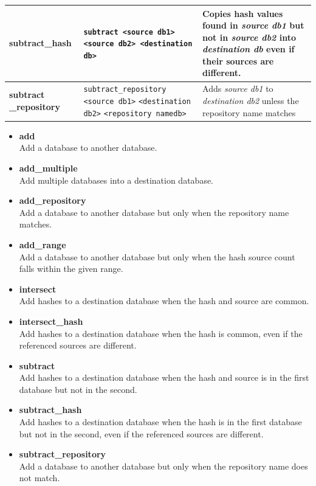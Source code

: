 \documentclass[11pt,fleqn]{article} %
\begin{document}
\begin{table}[!ht]
\begin{tabular}{|p{3.5 cm}|p{6 cm}|p{4 cm}|}
\hline
\textbf{subtract\_hash} & \verb+subtract <source db1>+ \verb+<source db2> <destination db>+&   Copies hash values found in \textit{source db1} but not in \textit{source db2} into \textit{destination db} even if their sources are different.\\
\hline
\textbf{subtract \_repository} & \verb+subtract_repository+ \verb+<source db1>+ \verb+<destination db2>+ \verb+<repository namedb>+ & Adds \textit{source db1} to \textit{destination db2} unless the repository name matches\\
\hline
\end{tabular}
\end{table}

\begin{itemize}
\item \textbf{add}\\
Add a database to another database.
\item \textbf{add\_multiple}\\
Add multiple databases into a destination database.
\item \textbf{add\_repository}\\
Add a database to another database but only when the repository name matches.
\item \textbf{add\_range}\\
Add a database to another database but only when the hash source count falls within the given range.
\item \textbf{intersect}\\
Add hashes to a destination database when the hash and source are common.
\item \textbf{intersect\_hash}\\
Add hashes to a destination database when the hash is common, even if the referenced sources are different.
\item \textbf{subtract}\\
Add hashes to a destination database when the hash and source is in the first database but not in the second.
\item \textbf{subtract\_hash}\\
Add hashes to a destination database when the hash is in the first database but not in the second, even if the referenced sources are different.
\item \textbf{subtract\_repository}\\
Add a database to another database but only when the repository name does not match.
\end{itemize}
\end{document}
